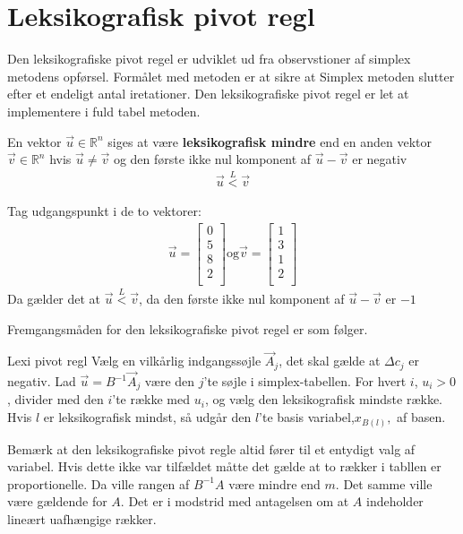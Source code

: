 \section{Leksikografisk pivot regl}
Den leksikografiske pivot regel er udviklet ud fra observstioner af simplex metodens opførsel. Formålet med metoden er at sikre at Simplex metoden slutter efter et endeligt antal iretationer. Den leksikografiske pivot regel er let at implementere i fuld tabel metoden. 
\begin{defn}
En vektor $\vec{u} \in \mathds{R}^n$ siges at være \textbf{leksikografisk mindre} end en anden vektor $\vec{v} \in \mathds{R}^n$ hvis $\vec{u} \neq \vec{v}$ og den første ikke nul komponent af $\vec{u}-\vec{v}$ er negativ 
\begin{align*}
\vec{u} \overset{L}{<} \vec{v}
\end{align*}
\end{defn}
\begin{eks}
Tag udgangspunkt i de to vektorer: 
\begin{align*}
\vec{u}=
\begin{bmatrix}
0\\
5\\
8\\
2\\
\end{bmatrix}
\text{og}
\vec{v}= 
\begin{bmatrix}
1\\
3\\
1\\
2\\
\end{bmatrix}
\end{align*}
Da gælder det at $\vec{u} \overset{L}{<} \vec{v}$, da den første ikke nul komponent af $\vec{u}-\vec{v}$ er $-1$
\end{eks}

Fremgangsmåden for den leksikografiske pivot regel er som følger.
  
\begin{pro}{Lexi pivot regl}
Vælg en vilkårlig indgangssøjle $\vec{A}_j$, det skal gælde at $\Delta c_j$ er negativ. Lad $\vec{u}=B^{-1}\vec{A}_j$ være den $j$'te søjle i simplex-tabellen.
For hvert $i$, $u_i>0$, divider med den $i$'te række med $u_i$, og vælg den leksikografisk mindste række. Hvis $l$ er leksikografisk mindst, så udgår den $l$'te basis variabel,$x_{B(l)},$ af basen. 
\end{pro}

Bemærk at den leksikografiske pivot regle altid fører til et entydigt valg af variabel. Hvis dette ikke var tilfældet måtte det gælde at to rækker i tabllen er proportionelle. Da ville rangen af $B^{-1}A$ være mindre end $m$. Det samme ville være gældende for $A$. Det er i modstrid med antagelsen om at $A$ indeholder lineært uafhængige rækker. 

